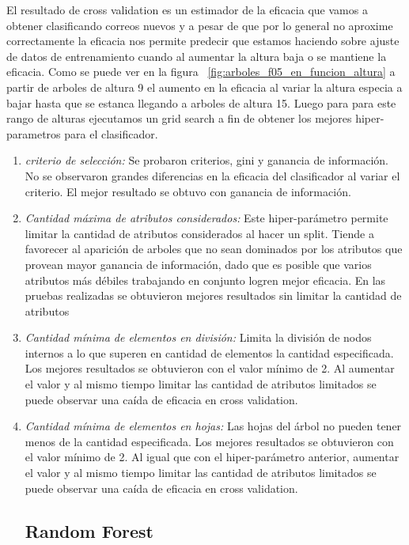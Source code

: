 	El resultado de cross validation es un estimador de la eficacia que vamos a obtener clasificando correos nuevos y a pesar de que por lo general no aproxime correctamente la eficacia nos permite predecir que estamos haciendo sobre ajuste de datos de entrenamiento cuando al aumentar la altura baja o se mantiene la eficacia. Como se puede ver en la figura ~\ref{fig:arboles_f05_en_funcion_altura} a partir de arboles de altura 9 el aumento en la eficacia al variar la altura especia a bajar hasta que se estanca llegando a arboles de altura 15. 
    Luego para para este rango de alturas ejecutamos un grid search a fin de obtener los mejores hiper-parametros para el clasificador. 
 \begin{enumerate}
\item \textit{criterio de selección:} Se probaron criterios, gini y ganancia de información. No se observaron grandes diferencias en la eficacia del clasificador al variar el criterio. El mejor resultado se obtuvo con ganancia de información. 
\item \textit{Cantidad máxima de atributos considerados:} Este hiper-parámetro permite limitar la cantidad de atributos considerados al hacer un split.  Tiende a favorecer al aparición de arboles que no sean dominados por los atributos que provean mayor ganancia de información, dado que es posible que varios atributos más débiles trabajando en conjunto logren mejor eficacia.  En las pruebas realizadas se obtuvieron mejores resultados sin limitar la cantidad de atributos
\item \textit{Cantidad mínima de elementos en división:} Limita la división de nodos internos a lo que superen en cantidad de elementos la cantidad especificada. Los mejores resultados se obtuvieron con el valor mínimo de 2. Al aumentar el valor y al mismo tiempo limitar las cantidad de atributos limitados se puede observar una caída de eficacia en cross validation. 
\item \textit{Cantidad mínima de elementos en hojas:} Las hojas del árbol no pueden tener menos de la cantidad especificada. Los mejores resultados se obtuvieron con el valor mínimo de 2. Al igual que con el hiper-parámetro anterior, aumentar el valor y al mismo tiempo limitar las cantidad de atributos limitados se puede observar una caída de eficacia en cross validation.  

\subsection{Random Forest}


\end{enumerate}

